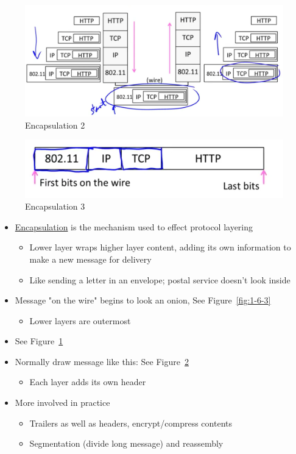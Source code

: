 \documentclass[12pt]{ctexart}   %
\begin{document}
	 \begin{figure}[h!] %
	 \centering
	 \includegraphics[scale=0.7]{images/1-6-4}
	\caption{ Encapsulation 2 }
	 \label{fig:1-6-4}
	 \end{figure}
	 
	 \begin{figure}[h!] %
	 \centering
	 \includegraphics[scale=0.7]{images/1-6-5}
	\caption{ Encapsulation 3 }
	 \label{fig:1-6-5}
	 \end{figure}
	 
	\begin{itemize}
		\item \underline{Encapsulation} is the mechanism used to effect protocol layering
		\begin{itemize}
			\item Lower layer wraps higher layer content, adding its own information to make a new message for delivery
			\item Like sending a letter in an envelope; postal service doesn't look inside
		\end{itemize}
		
		\item Message "on the wire" begins to look an onion, See Figure~\ref{fig:1-6-3}
		\begin{itemize}
			\item Lower layers are outermost
		\end{itemize}
		
		\item See Figure~\ref{fig:1-6-4}
		
		\item Normally draw message like this: See Figure~\ref{fig:1-6-5}
		\begin{itemize}
			\item Each layer adds its own header
		\end{itemize}
		
		\item More involved in practice
		\begin{itemize}
			\item Trailers as well as headers, encrypt/compress contents
			\item Segmentation (divide long message) and reassembly
		\end{itemize}
	\end{itemize}
	
\end{document}
